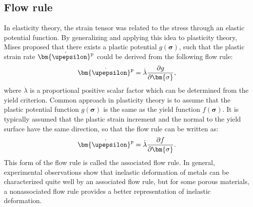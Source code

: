 \subsection{Flow rule}
\noindent
In elasticity theory, the strain tensor was related to the stress through an elastic potential function.
By generalizing and applying this idea to plasticity theory, Mises proposed that there exists a plastic potential $g(\bm{\sigma})$, such that the plastic strain rate $\dot{{\bm{\upepsilon }}^{\rm{p}}}$ could be derived from the following flow rule:
\begin{equation}
\dot{{\bm{\upepsilon }}^{\rm{p}}} = \dot\lambda \frac{\partial g}{\partial \bm{\sigma}},
\label{Equ:dgdsigma}
\end{equation}
where $\dot\lambda$ is a proportional positive scalar factor which can be determined from the yield criterion. 
Common approach in plasticity theory is to assume that the plastic potential function $g(\bm{\sigma})$ is the same as the yield function $f(\bm{\sigma})$.
It is typically assumed that the plastic strain increment and the normal to the yield surface have the same direction, so that the flow rule can be written as:
\begin{equation}
\dot{{\bm{\upepsilon }}^{\rm{p}}} = \dot\lambda \frac{\partial f}{\partial \bm{\sigma}}.
\end{equation}
This form of the flow rule is called the associated flow rule.
In general, experimental observations show that inelastic deformation of metals can be characterized quite well by an associated flow rule, but for some porous materials, a nonassociated flow rule provides a better representation of inelastic deformation.

